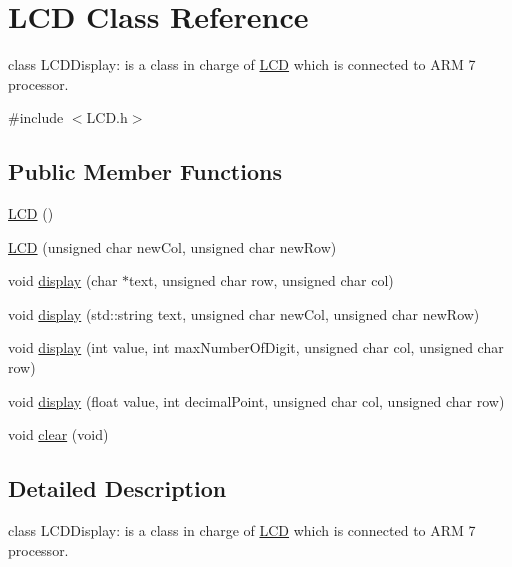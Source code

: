 \hypertarget{class_l_c_d}{
\section{LCD Class Reference}
\label{df/dd6/class_l_c_d}
}


class LCDDisplay: is a class in charge of \hyperlink{class_l_c_d}{LCD} which is connected to ARM 7 processor.  




{\ttfamily \#include $<$LCD.h$>$}

\subsection*{Public Member Functions}
\begin{DoxyCompactItemize}
\item 
\hyperlink{class_l_c_d_a00bb2db1390721abc7b24ac4b8c276c8}{LCD} ()
\item 
\hyperlink{group__group4_ga32e550ea850f2061ca5981f6115b275f}{LCD} (unsigned char newCol, unsigned char newRow)
\item 
void \hyperlink{group__group4_ga445cd6497e7d4ff4d15826f3ca1ee648}{display} (char $\ast$text, unsigned char row, unsigned char col)
\item 
void \hyperlink{group__group4_ga9b2221e38e57d142d0c69e716195639d}{display} (std::string text, unsigned char newCol, unsigned char newRow)
\item 
void \hyperlink{group__group4_gac0d73080423795794990d2a22aafc51d}{display} (int value, int maxNumberOfDigit, unsigned char col, unsigned char row)
\item 
void \hyperlink{group__group4_ga18edbaed2656fbec0f6d544e4e50ae19}{display} (float value, int decimalPoint, unsigned char col, unsigned char row)
\item 
void \hyperlink{group__group4_gaca6cd9e401283d5fa4917d53260b3ba9}{clear} (void)
\end{DoxyCompactItemize}


\subsection{Detailed Description}
class LCDDisplay: is a class in charge of \hyperlink{class_l_c_d}{LCD} which is connected to ARM 7 processor. 


